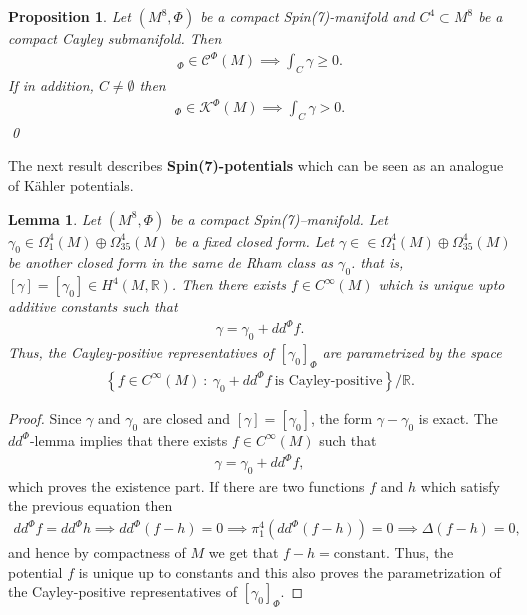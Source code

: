 \documentclass[10pt,a4paper,reqno]{article}
\newtheorem{lemma}[theorem]{Lemma}
\newtheorem{proposition}[theorem]{Proposition}
\theoremstyle{definition}
\numberwithin{equation}{section}
\def\bR{\mathbb R}
\def\ddphi{dd^{\Phi}}
\def\cC{\mathcal{C}}
\def\cK{\mathcal{K}}
\begin{document}
\begin{proposition}
Let $(M^8, \Phi)$ be a compact Spin(7)-manifold and $C^4\subset M^8$ be a compact Cayley submanifold. Then
\begin{align*}
[\gamma]_{\Phi}\in \cC^{\Phi}(M) \implies \int_C \gamma \geq 0.
\end{align*}
If in addition, $C\neq \emptyset$ then
\begin{align*}
 [\gamma]_{\Phi}\in \cK^{\Phi}(M) \implies \int_C \gamma > 0.   
\end{align*}
\qed
\end{proposition}

The next result describes \textbf{Spin(7)-potentials} which can be seen as an analogue of K\"ahler potentials.

\begin{lemma}\label{lem:spin7potential}
Let $(M^8, \Phi)$ be a compact Spin(7)--manifold. Let $\gamma_0\in \Omega^4_1(M)\oplus \Omega^4_{35}(M)$ be a fixed closed form. Let $\gamma \in \in \Omega^4_1(M)\oplus \Omega^4_{35}(M)$ be another closed form in the same de Rham class as $\gamma_0$. that is, $[\gamma]=[\gamma_0]\in H^4(M, \bR)$. Then there exists $f\in C^{\infty}(M)$ which is unique upto additive constants such that
\begin{align*}
\gamma=\gamma_0+\ddphi f.
\end{align*}
Thus, the Cayley-positive representatives of $[\gamma_0]_{\Phi}$ are parametrized by the space
\begin{align*}
\left\{f\in C^{\infty}(M)\ :\ \gamma_0+\ddphi f\ \text{is\ Cayley-positive} \right\}/\bR.
\end{align*}
\end{lemma}

\begin{proof}
Since $\gamma$ and $\gamma_0$ are closed and $[\gamma]=[\gamma_0]$, the form $\gamma-\gamma_0$ is exact. The $\ddphi$-lemma  implies that there exists $f\in C^{\infty}(M)$ such that
\begin{align*}
\gamma=\gamma_0+\ddphi f,
\end{align*}
which proves the existence part. If there are two functions $f$ and $h$ which satisfy the previous equation then
\begin{align*}
\ddphi f=\ddphi h \implies \ddphi(f-h)=0 \implies \pi^4_{1}(\ddphi(f-h))=0\implies \Delta (f-h)=0,
\end{align*}
and hence by compactness of $M$ we get that $f-h=\text{constant}$. Thus, the potential $f$ is unique up to constants and this also proves the parametrization of the Cayley-positive representatives of $[\gamma_0]_{\Phi}$.
\end{proof}
\end{document}

